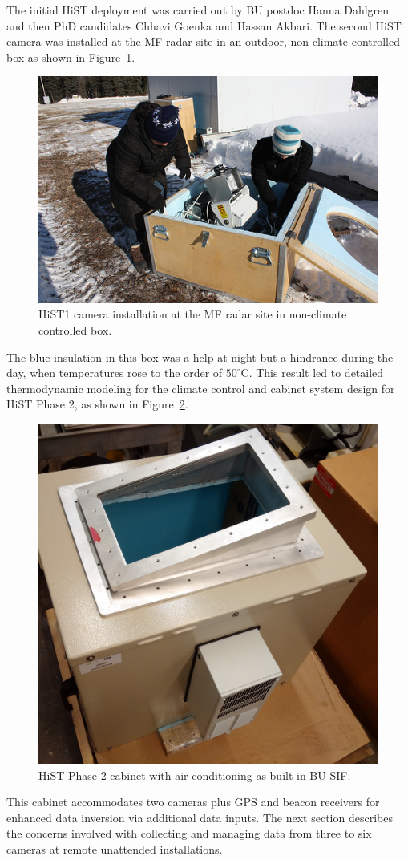 The initial HiST deployment was carried out by BU postdoc Hanna Dahlgren and then PhD candidates Chhavi Goenka and Hassan Akbari.
The second HiST camera was installed at the MF radar site in an outdoor, non-climate controlled box as shown in Figure~\ref{fig:hst2}.
\begin{figure}\centering
	\includegraphics[width=0.9\linewidth]{gfx/HST1}
	\caption{HiST1 camera installation at the MF radar site in non-climate controlled box.}
	\label{fig:hst2}
\end{figure}
The blue insulation in this box was a help at night but a hindrance during the day, when temperatures rose to the order of $50^\circ$C.
This result led to detailed thermodynamic modeling for the climate control and cabinet system design for HiST Phase 2, as shown in Figure~\ref{fig:hist2cab}.
\begin{figure}
	\includegraphics[width=\linewidth]{gfx/phase2cabinet}
	\caption{HiST Phase 2 cabinet with air conditioning as built in BU SIF.}
	\label{fig:hist2cab}
\end{figure}
This cabinet accommodates two cameras plus GPS and beacon receivers for enhanced data inversion via additional data inputs.
The next section describes the concerns involved with collecting and managing data from three to six cameras at remote unattended installations.


